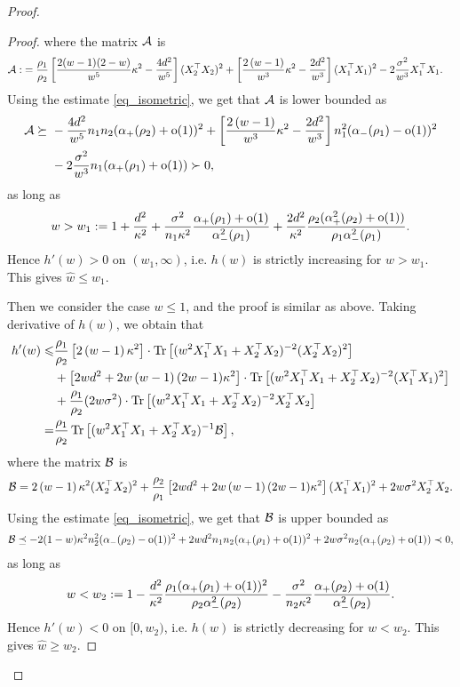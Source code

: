 \begin{proof}
\begin{proof}
where the matrix $\cal A$ is
\begin{align*}
\cal A :&= \frac{\rho_1}{\rho_2}\left[ \frac{2(w-1)(2-w)}{w^5}\kappa^2 - \frac{4d^2}{w^5}\right](X_2^{\top}X_2)^2 + \left[\frac{2\left( w-1\right)}{w^3}\kappa^2 - \frac{2d^2}{w^3} \right](X_1^{\top}X_1)^2 - 2 \frac{\sigma^2}{w^3}X_1^\top X_1.
\end{align*}
Using the estimate \eqref{eq_isometric}, we get that $\cal A$ is lower bounded as
\begin{align*}
\cal A \succeq&~ - \frac{4d^2}{w^5}n_1n_2 (\al_+(\rho_2)+\oo(1))^2 + \left[\frac{2\left( w-1\right)}{w^3}\kappa^2 - \frac{2d^2}{w^3} \right]n_1^2 (\al_-(\rho_1)-\oo(1))^2 \\
&~ - 2 \frac{\sigma^2}{w^3}n_1(\al_{+}(\rho_1)+\oo(1)) \succ 0,
\end{align*}
as long as
$$w> w_1:=1 +\frac{d^2}{\kappa^2}+ \frac{\sigma^2}{n_1\kappa^2}\frac{\al_{+}(\rho_1)+\oo(1)}{\al_{-}^2(\rho_1)} + \frac{2d^2}{\kappa^2}\frac{\rho_2(\al_+^2(\rho_2)+\oo(1))}{\rho_1\al_-^2(\rho_1) }.$$
Hence $h'(w)>0$ on $(w_1,\infty)$, i.e. $h(w)$ is strictly increasing for $w>w_1$. This gives $\hat w\le w_1$.

Then we consider the case $w\le 1$, and the proof is similar as above. Taking derivative of $h(w)$, we obtain that
\begin{align}
	h'(w) \le& \frac{\rho_1}{\rho_2} \left[2\left( w-1\right) \kappa^2\right]\cdot \tr\left[( w^2X_1^{\top}X_1 +X_2^{\top}X_2)^{-2} (X_2^{\top}X_2)^2\right] \nonumber \\
	& +  \left[2wd^2 +2w\left( w-1\right)(2w-1)\kappa^2\right]\cdot \tr\left[( w^2X_1^{\top}X_1 +X_2^{\top}X_2)^{-2} (X_1^{\top}X_1)^2\right] \nonumber\\
	& + \frac{\rho_1}{\rho_2}(2 w\sigma^2) \cdot \bigtr{(w^2X_1^{\top}X_1 + X_2^{\top}X_2)^{-2} X_2^\top X_2  }\\
			 =& \frac{\rho_1}{\rho_2} \bigtr{(w^2X_1^{\top}X_1  + X_2^{\top}X_2)^{-1} \cal B} , \nonumber
\end{align}
where the matrix $\cal B$ is
$$\cal B= 2\left( w-1\right) \kappa^2  (X_2^{\top}X_2)^2+\frac{\rho_2}{\rho_1}\left[2wd^2 +2w\left( w-1\right)(2w-1)\kappa^2\right](X_1^{\top}X_1)^2 + 2 w\sigma^2 X_2^\top X_2 .$$
Using the estimate \eqref{eq_isometric}, we get that $\cal B$ is upper bounded as
\begin{align*}
\cal B \preceq - 2(1-w)\kappa^2 n_2^2 (\al_-(\rho_2) -\oo(1))^2 +2w d^2 n_1n_2 (\al_+(\rho_1) +\oo(1))^2 + 2w\sigma^2 n_2 (\al_+(\rho_2)+\oo(1)) \prec 0,
\end{align*}
as long as
$$w< w_2:=1 -   \frac{d^2}{\kappa^2}\frac{\rho_1(\al_+(\rho_1) +\oo(1))^2}{\rho_2 \al_-^2(\rho_2) } -  \frac{\sigma^2}{n_2\kappa^2}\frac{\al_{+}(\rho_2)+\oo(1)}{\al_{-}^2(\rho_2)} .$$
Hence $h'(w)<0$ on $[0,w_2)$, i.e. $h(w)$ is strictly decreasing for $w<w_2$. This gives $\hat w\ge w_2$.


\end{proof}
\end{proof}
